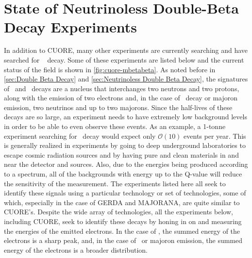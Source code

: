 \section{State of Neutrinoless Double-Beta Decay Experiments}
\label{sec:State of Neutrinoless Double Beta Decay Experiments}
In addition to CUORE, many other experiments are currently searching and have searched for \zeronubb~ decay. Some of these experiments are listed below and the current status of the field is shown in \autoref{fig:cuore-mbetabeta}.
As noted before in \autoref{sec:Double Beta Decay} and \autoref{sec:Neutrinoless Double Beta Decay}, the signatures of \zeronubb~and \twonubb~decays are a nucleus that interchanges two neutrons and two protons, along with the emission of two electrons and, in the case of \twonubb~decay or majoron emission, two neutrinos and up to two majorons.
Since the half-lives of these decays are so large, an experiment needs to have extremely low background levels in order to be able to even observe these events.
As an example, a 1-tonne experiment searching for \zeronubb~decay would expect only $\mathcal{O}(10)$ events per year.
This is generally realized in experiments by going to deep underground laboratories to escape cosmic radiation sources and by having pure and clean materials in and near the detector and sources.
Also, due to the energies being produced according to a spectrum, all of the backgrounds with energy up to the Q-value will reduce the sensitivity of the measurement.
The experiments listed here all seek to identify these signals using a particular technology or set of technologies, some of which, especially in the case of GERDA and MAJORANA, are quite similar to CUORE's.
Despite the wide array of technologies, all the experiments below, including CUORE, seek to identify these decays by honing in on and measuring the energies of the emitted electrons.
In the case of \zeronubb, the summed energy of the electrons is a sharp peak, and, in the case of \twonubb~or majoron emission, the summed energy of the electrons is a broader distribution.

